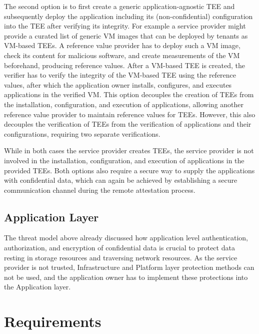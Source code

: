 \begin{description}[style=standard]
    The second option is to first create a generic application-agnostic TEE and
    subsequently deploy the application including its (non-confidential)
    configuration into the TEE after verifying its integrity. For example a
    service provider might provide a curated list of generic VM images that can
    be deployed by tenants as VM-based TEEs. A reference value provider has to
    deploy such a VM image, check its content for malicious software, and create
    measurements of the VM beforehand, producing reference values. After a
    VM-based TEE is created, the verifier has to verify the integrity of the
    VM-based TEE using the reference values, after which the application owner
    installs, configures, and executes applications in the verified VM. This
    option decouples the creation of TEEs from the installation, configuration,
    and execution of applications, allowing another reference value provider to
    maintain reference values for TEEs. However, this also decouples the
    verification of TEEs from the verification of applications and their
    configurations, requiring two separate verifications.

    While in both cases the service provider creates TEEs, the service provider
    is not involved in the installation, configuration, and execution of
    applications in the provided TEEs. Both options also require a secure way to
    supply the applications with confidential data, which can again be achieved
    by establishing a secure communication channel during the remote attestation
    process.
\end{description}

\subsection{Application Layer}

The threat model above already discussed how application level authentication,
authorization, and encryption of confidential data is crucial to protect data
resting in storage resources and traversing network resources. As the service
provider is not trusted, Infrastructure and Platform layer protection methods
can not be used, and the application owner has to implement these protections
into the Application layer.

\section{Requirements}
\label{sec:requirements}


